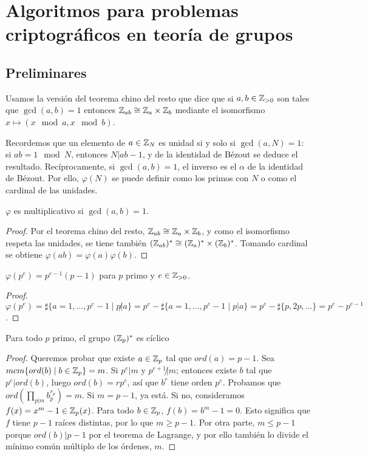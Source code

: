 \documentclass[CR.tex]{subfiles}
\begin{document}

\chapter{Algoritmos para problemas criptográficos en teoría de grupos}
\section{Preliminares}
Usamos la versión del teorema chino del resto que dice que si $a,b\in\mathbb{Z}_{>0}$ son tales que $\gcd(a,b)=1$ entonces $\mathbb{Z}_{ab}\cong \mathbb{Z}_a\times\mathbb{Z}_b$ mediante el isomorfismo $x\mapsto (x\mod a,x\mod b)$. 

Recordemos que un elemento de $a\in \mathbb{Z}_N$ es unidad si y solo si $\gcd(a,N)=1$: si $ab=1\mod N$, entonces $N|ab-1$, y de la identidad de Bézout se deduce el resultado. Recíprocamente, si $\gcd(a,b)=1$, el inverso es el $\alpha$ de la identidad de Bézout. Por ello, $\varphi(N)$ se puede definir como los primos con $N$ o como el cardinal de las unidades.

\begin{lemma}
$\varphi$ es multiplicativo si $\gcd(a,b)=1$. 
\end{lemma}
\begin{proof}
Por el teorema chino del resto, $\mathbb{Z}_{ab}\cong\mathbb{Z}_a\times\mathbb{Z}_b$, y como el isomorfismo respeta las unidades, se tiene también $(\mathbb{Z}_{ab})^*\cong(\mathbb{Z}_a)^*\times(\mathbb{Z}_b)^*$. Tomando cardinal se obtiene $\varphi(ab)=\varphi(a)\varphi(b)$. 
\end{proof}
\begin{lemma}
$\varphi(p^e)=p^{e-1}(p-1)$ para $p$ primo y $e\in\mathbb{Z}_{>0}$.
\end{lemma}
\begin{proof}
$\varphi(p^e)=\sharp\{a=1,\dots, p^e-1\mid p\not| a\}=p^e-\sharp\{a=1,\dots, p^e-1\mid p|a\}=p^e-\sharp\{p,2p,\dots\}=p^e-p^{e-1}$.
\end{proof}


\begin{lemma}
Para todo $p$ primo, el grupo $(\mathbb{Z}_p)^*$ es cíclico 
\end{lemma}
\begin{proof}
Queremos probar que existe $a\in\mathbb{Z}_p$ tal que $ord(a)=p-1$. Sea $mcm\{ord(b)\mid b\in\mathbb{Z}_p\}=m$. Si $p^e|m$ y $p^{e+1}\not| m$; entonces existe $b$ tal que $p^e| ord(b)$, luego $ord(b)=rp^e$, así que $b^{r}$ tiene orden $p^e$. Probamos que $ord(\prod_{p|m}b_p^{r_p})=m$. Si $m=p-1$, ya está. Si no, consideramos $f(x)=x^m-1\in\mathbb{Z}_p(x)$. Para todo $b\in\mathbb{Z}_p$, $f(b)=b^m-1=0$. Esto significa que $f$ tiene $p-1$ raíces distintas, por lo que $m\geq p-1$. Por otra parte, $m\leq p-1$ porque $ord(b)|p-1$ por el teorema de Lagrange, y por ello también lo divide el mínimo común múltiplo de los órdenes, $m$. 
\end{proof}
\end{document}
